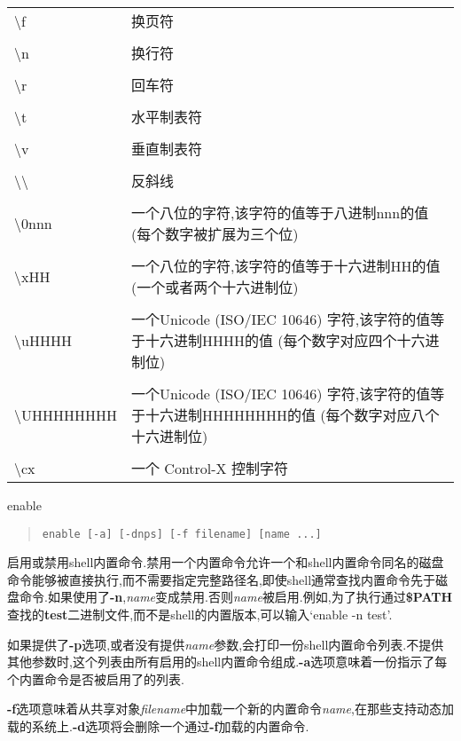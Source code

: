 \documentclass[draft,openany]{book}
\begin{document}
\begin{CJK}{UTF8}{gbsn}
\begin{basedescript}{\desclabelstyle{\nextlinelabel}\desclabelwidth{2.5em}}
\begin{tabular}{lp{32em}}
            \textbackslash f & 换页符 \\ \\
            \textbackslash n & 换行符 \\ \\
            \textbackslash r & 回车符 \\ \\
            \textbackslash t & 水平制表符 \\ \\
            \textbackslash v & 垂直制表符 \\ \\
            \textbackslash \textbackslash & 反斜线 \\ \\
            \textbackslash 0nnn & 一个八位的字符,该字符的值等于八进制nnn的值(每个数字被扩展为三个位) \\ \\
            \textbackslash xHH & 一个八位的字符,该字符的值等于十六进制HH的值(一个或者两个十六进制位) \\ \\
            \textbackslash uHHHH & 一个Unicode (ISO/IEC 10646) 字符,该字符的值等于十六进制HHHH的值 (每个数字对应四个十六进制位) \\ \\
            \textbackslash UHHHHHHHH & 一个Unicode (ISO/IEC 10646) 字符,该字符的值等于十六进制HHHHHHHH的值 (每个数字对应八个十六进制位) \\ \\
            \textbackslash cx & 一个 Control-X 控制字符
        \end{tabular}
    \item[enable]
        \begin{quote}
            \verb+enable [-a] [-dnps] [-f filename] [name ...]+
        \end{quote}
        启用或禁用shell内置命令.禁用一个内置命令允许一个和shell内置命令同名的磁盘命令能够被直接执行,而不需要指定完整路径名,即使shell通常查找内置命令先于磁盘命令.如果使用了\textbf{-n},\emph{name}变成禁用.否则\emph{name}被启用.例如,为了执行通过\textbf{\$PATH}查找的\textbf{test}二进制文件,而不是shell的内置版本,可以输入`enable -n test'.\par
        如果提供了\textbf{-p}选项,或者没有提供\emph{name}参数,会打印一份shell内置命令列表.不提供其他参数时,这个列表由所有启用的shell内置命令组成.\textbf{-a}选项意味着一份指示了每个内置命令是否被启用了的列表.\par
        \textbf{-f}选项意味着从共享对象\emph{filename}中加载一个新的内置命令\emph{name},在那些支持动态加载的系统上.\textbf{-d}选项将会删除一个通过\textbf{-f}加载的内置命令.\par

\end{basedescript}
\end{CJK}
\end{document}
